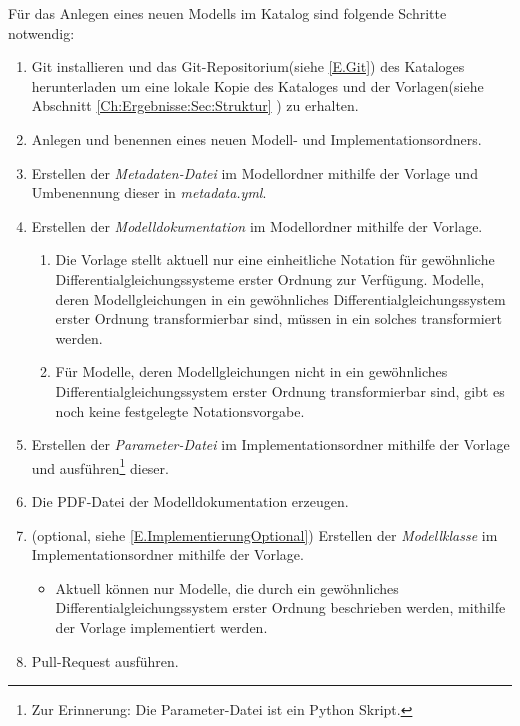 Für das Anlegen eines neuen Modells im Katalog sind folgende Schritte notwendig:
\begin{enumerate}
	\item Git installieren und das Git-Repositorium(siehe \ref{E.Git}) des Kataloges herunterladen um eine lokale Kopie des Kataloges und der Vorlagen(siehe Abschnitt \ref{Ch:Ergebnisse:Sec:Struktur} ) zu erhalten.
	\item Anlegen und benennen eines neuen Modell- und Implementationsordners.
	\item Erstellen der \textit{Metadaten-Datei} im Modellordner mithilfe der Vorlage und Umbenennung dieser in \textit{metadata.yml}.
	\item Erstellen der \textit{Modelldokumentation} im Modellordner mithilfe der Vorlage.
	\begin{enumerate}[label=\textbf{Anmerkung \arabic*}:, wide=0pt, leftmargin=*]
		\item Die Vorlage stellt aktuell nur eine einheitliche Notation für gewöhnliche Differentialgleichungssysteme erster Ordnung zur Verfügung. Modelle, deren Modellgleichungen in ein gewöhnliches Differentialgleichungssystem erster Ordnung transformierbar sind, müssen in ein solches transformiert werden.
		\item Für Modelle, deren Modellgleichungen nicht in ein gewöhnliches Differentialgleichungssystem erster Ordnung transformierbar sind, gibt es noch keine festgelegte Notationsvorgabe.
	\end{enumerate}
	\item Erstellen der \textit{Parameter-Datei} im Implementationsordner mithilfe der Vorlage und ausführen\footnote{Zur Erinnerung: Die Parameter-Datei ist ein Python Skript.} dieser.
	\item Die PDF-Datei der Modelldokumentation erzeugen.
	\item (optional, siehe \ref{E.ImplementierungOptional}) Erstellen der \textit{Modellklasse} im Implementationsordner mithilfe der Vorlage.
	\begin{itemize}[label=\textbf{Anmerkung}:, wide=0pt, leftmargin=*]
		\item Aktuell können nur Modelle, die durch ein gewöhnliches Differentialgleichungssystem erster Ordnung beschrieben werden, mithilfe der Vorlage implementiert werden.
	\end{itemize}
	\item Pull-Request ausführen.
\end{enumerate}





